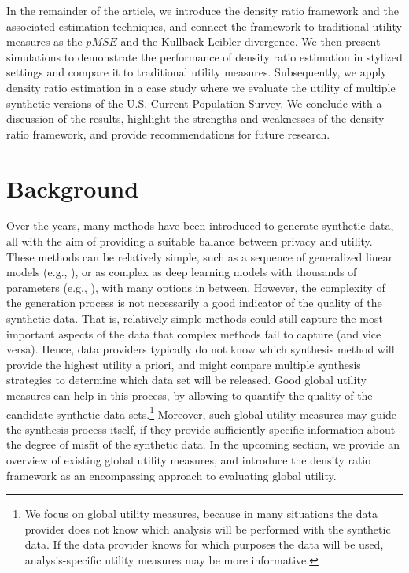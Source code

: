\documentclass[
]{article}
\begin{document}
In the remainder of the article, we introduce the density ratio
framework and the associated estimation techniques, and connect the
framework to traditional utility measures as the \(pMSE\) and the
Kullback-Leibler divergence. We then present simulations to demonstrate
the performance of density ratio estimation in stylized settings and
compare it to traditional utility measures. Subsequently, we apply
density ratio estimation in a case study where we evaluate the utility
of multiple synthetic versions of the U.S. Current Population Survey. We
conclude with a discussion of the results, highlight the strengths and
weaknesses of the density ratio framework, and provide recommendations
for future research.

\section{Background}\label{background}

Over the years, many methods have been introduced to generate synthetic
data, all with the aim of providing a suitable balance between privacy
and utility. These methods can be relatively simple, such as a sequence
of generalized linear models (e.g.,
), or as complex as
deep learning models with thousands of parameters (e.g.,
), with many options in
between. However, the complexity of the generation process is not
necessarily a good indicator of the quality of the synthetic data. That
is, relatively simple methods could still capture the most important
aspects of the data that complex methods fail to capture (and vice
versa). Hence, data providers typically do not know which synthesis
method will provide the highest utility a priori, and might compare
multiple synthesis strategies to determine which data set will be
released. Good global utility measures can help in this process, by
allowing to quantify the quality of the candidate synthetic data
sets.\footnote{We focus on global utility measures, because in many
  situations the data provider does not know which analysis will be
  performed with the synthetic data. If the data provider knows for
  which purposes the data will be used, analysis-specific utility
  measures may be more informative.} Moreover, such global utility
measures may guide the synthesis process itself, if they provide
sufficiently specific information about the degree of misfit of the
synthetic data. In the upcoming section, we provide an overview of
existing global utility measures, and introduce the density ratio
framework as an encompassing approach to evaluating global utility.
\end{document}
